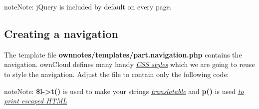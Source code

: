 \documentclass[letterpaper,10pt,english]{sphinxmanual}
\begin{document}
\begin{notice}{note}{Note:}
jQuery is included by default on every page.
\end{notice}


\subsection{Creating a navigation}
\label{app/tutorial:creating-a-navigation}
The template file \textbf{ownnotes/templates/part.navigation.php} contains the navigation. ownCloud defines many handy {\hyperref[app/css::doc]{\emph{\emph{CSS styles}}}} which we are going to reuse to style the navigation. Adjust the file to contain only the following code:

\begin{notice}{note}{Note:}
\textbf{\$l-\textgreater{}t()} is used to make your strings {\hyperref[app/l10n::doc]{\emph{\emph{translatable}}}} and \textbf{p()} is used {\hyperref[app/templates::doc]{\emph{\emph{to print escaped HTML}}}}
\end{notice}
\end{document}
